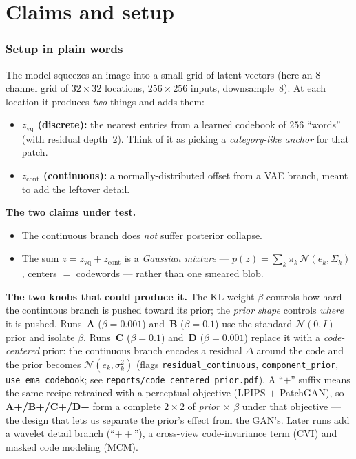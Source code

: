 \documentclass[11pt]{article}
\begin{document}
\part{Claims and setup}

\section{Setup in plain words}
\label{sec:setup}
The model squeezes an image into a small grid of latent vectors (here an $8$-channel grid
of $32\times32$ locations, $256\times256$ inputs, downsample~$8$). At each location it
produces \emph{two} things and adds them:
\begin{itemize}
  \item \textbf{$z_{\text{vq}}$ (discrete):} the nearest entries from a learned codebook of
  $256$ ``words'' (with residual depth~$2$). Think of it as picking a \emph{category-like
  anchor} for that patch.
  \item \textbf{$z_{\text{cont}}$ (continuous):} a normally-distributed offset from a VAE
  branch, meant to add the leftover detail.
\end{itemize}

\textbf{The two claims under test.}
\begin{itemize}
  \item[\textbf{(A)}] The continuous branch does \emph{not} suffer posterior collapse.
  \item[\textbf{(B)}] The sum $z=z_{\text{vq}}+z_{\text{cont}}$ is a \emph{Gaussian mixture}
  --- $p(z)=\sum_k\pi_k\,\mathcal{N}(e_k,\Sigma_k)$, centers $=$ codewords --- rather than one
  smeared blob.
\end{itemize}

\textbf{The two knobs that could produce it.} The KL weight $\beta$ controls how hard the
continuous branch is pushed toward its prior; the \emph{prior shape} controls \emph{where} it is
pushed. Runs~\textbf{A} ($\beta{=}0.001$) and~\textbf{B} ($\beta{=}0.1$) use the standard
$\mathcal{N}(0,I)$ prior and isolate $\beta$. Runs~\textbf{C} ($\beta{=}0.1$) and~\textbf{D}
($\beta{=}0.001$) replace it with a \emph{code-centered} prior: the continuous branch encodes a
residual $\Delta$ around the code and the prior becomes $\mathcal{N}(e_k,\sigma_k^2)$ (flags
\texttt{residual\_continuous}, \texttt{component\_prior}, \texttt{use\_ema\_codebook}; see
\texttt{reports/code\_centered\_prior.pdf}). A ``$+$'' suffix means the same recipe retrained with
a perceptual objective (LPIPS $+$ PatchGAN), so \textbf{A+/B+/C+/D+} form a complete
$2\times2$ of \emph{prior} $\times$ $\beta$ under that objective --- the design that lets us
separate the prior's effect from the GAN's. Later runs add a wavelet detail branch (``$++$''), a
cross-view code-invariance term (CVI) and masked code modeling (MCM).
\end{document}
